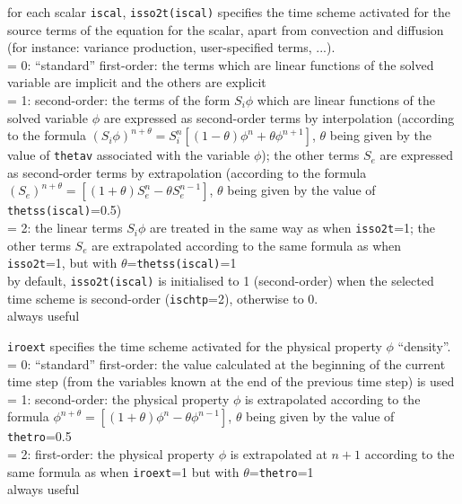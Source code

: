 {for each scalar {\tt iscal}, {\tt isso2t(iscal)} specifies the time scheme activated
for the source terms of the equation for the scalar, apart from convection and
diffusion (for instance: variance production, user-specified terms, ...).\\
\hspace*{1.3cm}= 0: ``standard'' first-order: the terms which are linear
functions of the solved variable are implicit and the others are explicit\\
\hspace*{1.3cm}= 1: second-order: the terms of the form $S_i\phi$ which are
linear functions of the solved variable
$\phi$ are expressed as second-order terms by interpolation (according
to the formula
$(S_i\phi)^{n+\theta}=S_i^n[(1-\theta)\phi^n+\theta\phi^{n+1}]$, $\theta$
being given by the value of {\tt thetav} associated with the variable $\phi$);
the other terms $S_e$ are expressed as second-order terms by
extrapolation (according to the formula
$(S_e)^{n+\theta}=[(1+\theta)S_e^n-\theta S_e^{n-1}]$, $\theta$ being
given by the value of {\tt thetss(iscal)}=0.5)\\
\hspace*{1.3cm}= 2: the linear terms $S_i\phi$ are treated in the same
way as when {\tt isso2t}=1;
the other terms $S_e$ are extrapolated according to the same formula
as when {\tt isso2t}=1, but with $\theta$={\tt thetss(iscal)}=1\\
by default, {\tt isso2t(iscal)} is initialised to 1 (second-order) when the selected
time scheme is second-order ({\tt ischtp}=2), otherwise to 0.\\
always useful}


{{\tt iroext} specifies the time scheme activated
for the physical property $\phi$ ``density''.\\
\hspace*{1.3cm}= 0: ``standard'' first-order: the value calculated at
the beginning of the current time step (from the
variables known at the end of the previous time step) is used \\
\hspace*{1.3cm}= 1: second-order: the physical property $\phi$ is
extrapolated according to the formula
$\phi^{n+\theta}=[(1+\theta)\phi^n-\theta \phi^{n-1}]$, $\theta$ being
given by the value of {\tt thetro}=0.5 \\
\hspace*{1.3cm}= 2: first-order: the physical property $\phi$ is
extrapolated at $n+1$ according to the
same formula as when {\tt iroext}=1 but with $\theta$={\tt thetro}=1\\
always useful}


